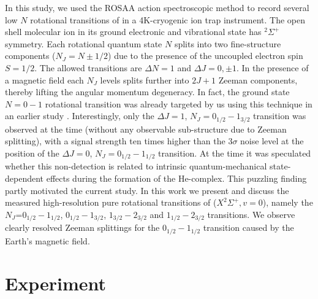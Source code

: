 In this study, we used the ROSAA action spectroscopic method \cite{Brunken2017} to record several low $N$ rotational transitions of \co in a 4K-cryogenic ion trap instrument. The open shell \co molecular ion in its ground electronic and vibrational state has $^2\Sigma ^+$ symmetry. Each rotational quantum state $N$ splits into two fine-structure components ($N_J=N \pm 1/2$) due to the presence of the uncoupled electron spin $S=1/2$. The allowed transitions are $\Delta N = 1$ and $\Delta J = 0, \pm 1$. In the presence of a magnetic field each $N_J$ levels splits further into $2J+1$ Zeeman components, thereby lifting the angular momentum degeneracy. In fact, the \co ground state $N=0-1$ rotational transition  was already targeted by us using this technique in an earlier study \cite{Brunken2017}. Interestingly, only the $\Delta J=1$, $N_J=0_{1/2}-1_{3/2}$ transition was observed at the time (without any observable sub-structure due to Zeeman splitting), with a signal strength ten times higher than the $3\sigma$ noise level at the position of the $\Delta J=0$,  $N_J=0_{1/2}-1_{1/2}$ transition. At the time it was speculated whether this non-detection is related to intrinsic quantum-mechanical state-dependent effects during the formation of the He-\co complex. This puzzling finding partly motivated the current study.
In this work we present and discuss the measured high-resolution pure rotational transitions of \co ($X ^2\Sigma ^+, v=0$), namely the $N_J$=$0_{1/2}-1_{1/2}$, $0_{1/2}-1_{3/2}$, $1_{3/2}-2_{3/2}$ and $1_{1/2}-2_{3/2}$ transitions. We observe clearly resolved Zeeman splittings for the $0_{1/2}-1_{1/2}$ transition caused by the Earth’s magnetic field.

\section{Experiment}
\label{sec:method}

